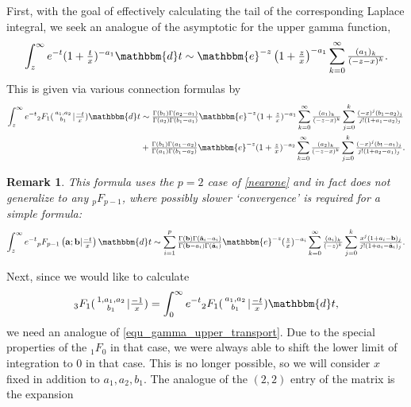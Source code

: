 \documentclass[12pt]{article}
\newcommand{\ee}[0] {\mathbbm{e}}
\newcommand{\dd}[0] {\mathbbm{d}}
\numberwithin{equation}{section}
\newtheorem{remark}[theorem]{Remark}
\newcommand{\FFs}[6] {{}_{#1}{#2}_{#3} ( \begin{smallmatrix} #4 \\ #5 \end{smallmatrix} | {#6}  )}
\newcommand{\FFf}[5] {{}_{#1}{#2}_{#3} \left(#4 | {#5} \right)}
\newcommand{\bfa}[0] {\mathbf{a}}
\newcommand{\bfb}[0] {\mathbf{b}}
\begin{document}
First, with the goal of effectively calculating the tail of the corresponding Laplace integral, we seek an analogue of the asymptotic for the upper gamma function,
\begin{equation*}
\int_{z}^{\infty} e^{-t} (1+\tfrac{t}{x})^{-a_1} \dd t \sim \ee^{-z} \left(1+\tfrac{z}{x}\right)^{-a_1} \sum_{k=0}^{\infty} \tfrac{(a_1)_k}{(-z-x)^k} \text{.}
\end{equation*}
This is given via various connection formulas by
\begin{equation}
\label{equ_3f1_int_tail}
\begin{alignedat}{3}
\int_{z}^{\infty} e^{-t} \FFs{2}{F}{1}{a_1,a_2}{b_1}{\tfrac{-t}{x}} \dd t &\sim \tfrac{\Gamma(b_1)\Gamma(a_2-a_1)}{\Gamma(a_2)\Gamma(b_1-a_1)}\ee^{-z} (1+\tfrac{z}{x})^{-a_1} \sum_{k=0}^{\infty} \tfrac{(a_1)_k}{(-z-x)^k} \sum_{j=0}^{k} \tfrac{(-x)^j(b_1-a_2)_j}{j!(1+a_1-a_2)_j}\\
&+\tfrac{\Gamma(b_1)\Gamma(a_1-a_2)}{\Gamma(a_1)\Gamma(b_1-a_2)}\ee^{-z} (1+\tfrac{z}{x})^{-a_2} \sum_{k=0}^{\infty} \tfrac{(a_2)_k}{(-z-x)^k} \sum_{j=0}^{k} \tfrac{(-x)^j(b_1-a_1)_j}{j!(1+a_2-a_1)_j} \text{.}
\end{alignedat}
\end{equation}
\begin{remark}
This formula uses the $p=2$ case of \eqref{nearone} and in fact does not generalize to any ${}_p F_{p-1}$, where possibly slower `convergence' is required for a simple formula:
\begin{equation*}
\int_{z}^{\infty} e^{-t} \FFf{p}{F}{p-1}{\bfa; \bfb}{\tfrac{-t}{x}}  \dd t \sim \sum_{i=1}^{p} \tfrac{\Gamma(\mathbf{b}) \Gamma(\hat{\mathbf{a}}_i-a_i)}{\Gamma(\mathbf{b}-a_i) \Gamma(\hat{\mathbf{a}}_i)} \ee^{-z} (\tfrac{z}{x})^{-a_i} \sum_{k=0}^{\infty} \tfrac{(a_i)_k}{(-z)^k} \sum_{j=0}^{k} \tfrac{x^j(1+a_i-\mathbf{b})_j}{j!(1+a_i-\hat{\mathbf{a}}_i)_j}\text{.}
\end{equation*}
\end{remark}
Next, since we would like to calculate
\begin{equation*}
\FFs{3}{F}{1}{1,a_1,a_2}{b_1}{\tfrac{-1}{x}} = \int_{0}^{\infty} e^{-t} \FFs{2}{F}{1}{a_1,a_2}{b_1}{\tfrac{-t}{x}} \dd t\text{,}
\end{equation*}
we need an analogue of \eqref{equ_gamma_upper_transport}. Due to the special properties of the ${}_1 F_{0}$ in that case, we were always able to shift the lower limit of integration to $0$ in that case. This is no longer possible, so we will consider $x$ fixed in addition to $a_1,a_2,b_1$. The analogue of the $(2,2)$ entry of the matrix is the expansion
\end{document}
